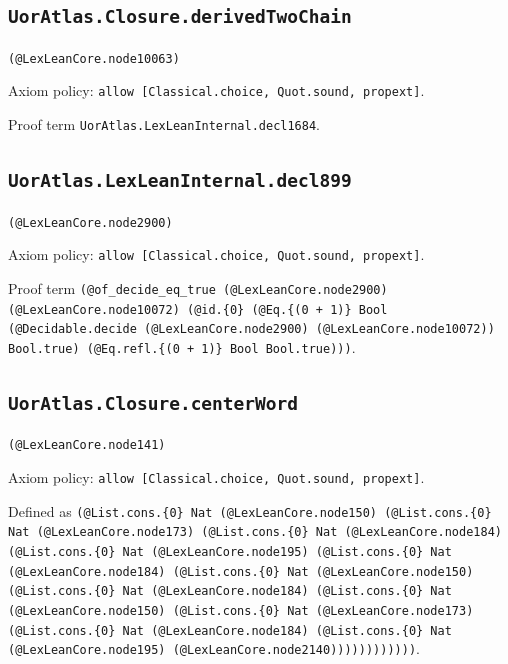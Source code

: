 \documentclass[11pt]{article}
\begin{document}
\subsection*{\texttt{UorAtlas.Closure.derivedTwoChain}}
\noindent\texttt{(@LexLeanCore.node10063)}\par
\noindent Axiom policy: \texttt{allow [Classical.choice, Quot.sound, propext]}.\par
\noindent Proof term \texttt{UorAtlas.LexLeanInternal.decl1684}.\par
\subsection*{\texttt{UorAtlas.LexLeanInternal.decl899}}
\noindent\texttt{(@LexLeanCore.node2900)}\par
\noindent Axiom policy: \texttt{allow [Classical.choice, Quot.sound, propext]}.\par
\noindent Proof term \texttt{(@of\_decide\_eq\_true (@LexLeanCore.node2900) (@LexLeanCore.node10072) (@id.\{0\} (@Eq.\{(0 + 1)\} Bool (@Decidable.decide (@LexLeanCore.node2900) (@LexLeanCore.node10072)) Bool.true) (@Eq.refl.\{(0 + 1)\} Bool Bool.true)))}.\par
\subsection*{\texttt{UorAtlas.Closure.centerWord}}
\noindent\texttt{(@LexLeanCore.node141)}\par
\noindent Axiom policy: \texttt{allow [Classical.choice, Quot.sound, propext]}.\par
\noindent Defined as \texttt{(@List.cons.\{0\} Nat (@LexLeanCore.node150) (@List.cons.\{0\} Nat (@LexLeanCore.node173) (@List.cons.\{0\} Nat (@LexLeanCore.node184) (@List.cons.\{0\} Nat (@LexLeanCore.node195) (@List.cons.\{0\} Nat (@LexLeanCore.node184) (@List.cons.\{0\} Nat (@LexLeanCore.node150) (@List.cons.\{0\} Nat (@LexLeanCore.node184) (@List.cons.\{0\} Nat (@LexLeanCore.node150) (@List.cons.\{0\} Nat (@LexLeanCore.node173) (@List.cons.\{0\} Nat (@LexLeanCore.node184) (@List.cons.\{0\} Nat (@LexLeanCore.node195) (@LexLeanCore.node2140))))))))))))}.\par
\end{document}
